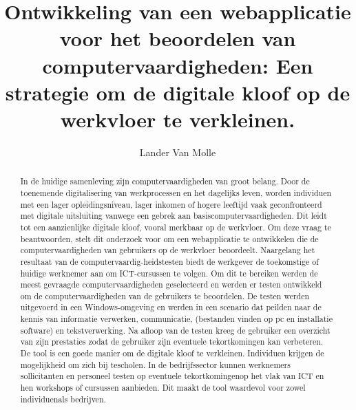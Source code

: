 \documentclass{hogent-article}
\title{Ontwikkeling van een webapplicatie voor het beoordelen van computervaardigheden: Een strategie om de digitale kloof op de werkvloer te verkleinen.}
\author{Lander {Van Molle}}
\begin{document}
\begin{abstract}
  In de huidige samenleving zijn computervaardigheden van groot belang. Door de toenemende digitalisering van werkprocessen en het dagelijks leven, worden individuen met een lager opleidingsniveau, lager inkomen of hogere leeftijd vaak geconfronteerd met digitale uitsluiting vanwege een gebrek aan basiscomputervaardigheden. Dit leidt tot een aanzienlijke digitale kloof, vooral merkbaar op de werkvloer.
  Om deze vraag te beantwoorden, stelt dit onderzoek voor om een webapplicatie te ontwikkelen die de computervaardigheden van gebruikers op de werkvloer beoordeelt. Naargelang het resultaat van de computervaardig-heidstesten biedt de werkgever de toekomstige of huidige werknemer aan om ICT-cursussen te volgen. Om dit te bereiken werden de meest gevraagde computervaardigheden geselecteerd en werden er testen ontwikkeld om de computervaardigheden van de gebruikers te beoordelen.
  De testen werden uitgevoerd in een Windows-omgeving en werden in een scenario dat peilden naar de kennis van informatie verwerken, communicatie, (bestanden vinden op pc en installatie software) en tekstverwerking. Na afloop van de testen kreeg de gebruiker een overzicht van zijn prestaties zodat de gebruiker zijn eventuele tekortkomingen kan verbeteren. De tool is een goede manier om de digitale kloof te verkleinen. Individuen krijgen de mogelijkheid om zich bij tescholen.
  In de bedrijfssector kunnen werknemers sollicitanten en personeel testen op eventuele tekortkomingenop het vlak van ICT en hen workshops of cursussen aanbieden. Dit maakt de tool waardevol voor zowel individuenals bedrijven.
\end{abstract}

\tableofcontents



\printbibliography[heading=bibintoc]
\end{document}
